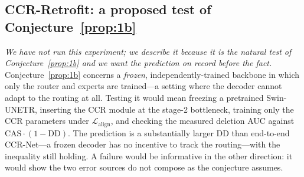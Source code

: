 \documentclass[runningheads]{llncs}
\begin{document}
\subsection{CCR-Retrofit: a proposed test of Conjecture~\ref{prop:1b}}\label{sec:retrofit}
\emph{We have not run this experiment; we describe it because it is the natural test of
Conjecture~\ref{prop:1b} and we want the prediction on record before the fact.}
Conjecture~\ref{prop:1b} concerns a \emph{frozen}, independently-trained backbone in which only
the router and experts are trained---a setting where the decoder cannot adapt to the routing at
all. Testing it would mean freezing a pretrained Swin-UNETR, inserting the CCR module at the
stage-2 bottleneck, training only the CCR parameters under
$\mathcal{L}_{\text{align}}$, and checking the measured deletion AUC against
$\mathrm{CAS}\cdot(1-\mathrm{DD})$. The prediction is a substantially larger DD than end-to-end
CCR-Net---a frozen decoder has no incentive to track the routing---with the inequality still
holding. A failure would be informative in the other direction: it would show the two error
sources do not compose as the conjecture assumes.

\end{document}
